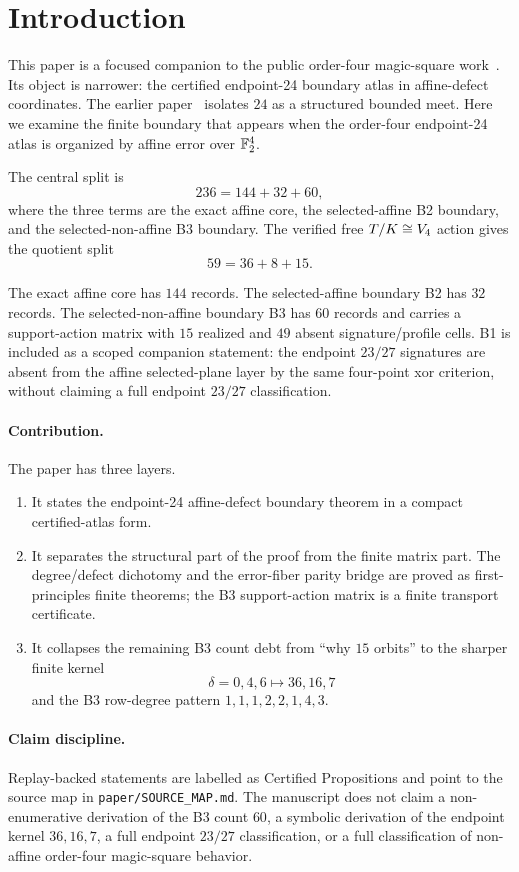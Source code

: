 \section{Introduction}

This paper is a focused companion to the public order-four magic-square work~\cite{babanskyy24Meet}.
Its object is narrower: the certified endpoint-24 boundary atlas in
affine-defect coordinates.  The earlier paper~\cite{babanskyy24Meet} isolates \(24\) as a structured
bounded meet.  Here we examine the finite boundary that appears when the
order-four endpoint-24 atlas is organized by affine error over \(\mathbb F_2^4\).

The central split is
\[
  236 = 144 + 32 + 60,
\]
where the three terms are the exact affine core, the selected-affine B2
boundary, and the selected-non-affine B3 boundary.  The verified free
\(T/K\cong V_4\) action gives the quotient split
\[
  59 = 36 + 8 + 15.
\]

The exact affine core has \(144\) records.  The selected-affine boundary B2 has
\(32\) records.  The selected-non-affine boundary B3 has \(60\) records and
carries a support-action matrix with \(15\) realized and \(49\) absent
signature/profile cells.  B1 is included as a scoped companion statement: the
endpoint \(23/27\) signatures are absent from the affine selected-plane layer by
the same four-point xor criterion, without claiming a full endpoint \(23/27\)
classification.

\paragraph{Contribution.}
The paper has three layers.
\begin{enumerate}[leftmargin=*]
\item It states the endpoint-24 affine-defect boundary theorem in a compact
  certified-atlas form.
\item It separates the structural part of the proof from the finite matrix
  part.  The degree/defect dichotomy and the error-fiber parity bridge are
  proved as first-principles finite theorems; the B3 support-action matrix is
  a finite transport certificate.
\item It collapses the remaining B3 count debt from ``why \(15\) orbits'' to
  the sharper finite kernel
  \[
    \delta=0,4,6\mapsto 36,16,7
  \]
  and the B3 row-degree pattern \(1,1,1,2,2,1,4,3\).
\end{enumerate}

\paragraph{Claim discipline.}
Replay-backed statements are labelled as Certified Propositions and point to
the source map in \texttt{paper/SOURCE\_MAP.md}.  The manuscript does not claim
a non-enumerative derivation of the B3 count \(60\), a symbolic derivation of
the endpoint kernel \(36,16,7\), a full endpoint \(23/27\) classification, or a
full classification of non-affine order-four magic-square behavior.